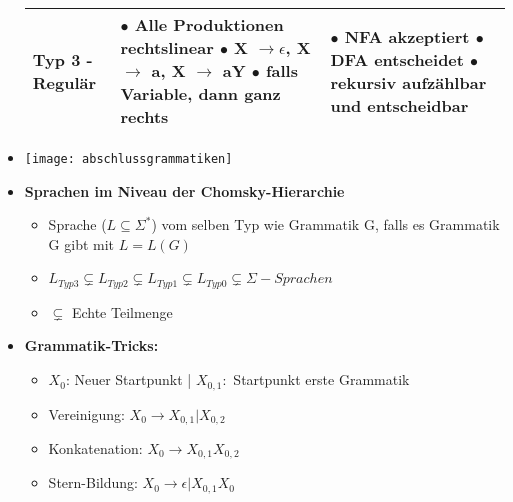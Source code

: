 \begin{itemize}
\begin{longtable}[h]{|p{4cm} | p{6cm} | p{7cm}|}
Typ 3 - Regulär &  \makecell[l]{$\bullet$ Alle Produktionen rechtslinear \\
$\bullet$ X $\rightarrow \epsilon$, X $\rightarrow$ a, X $\rightarrow$ aY \\
$\bullet$ falls Variable, dann ganz rechts} &
\makecell[l]{$\bullet$ NFA akzeptiert \\ $\bullet$ DFA entscheidet \\$\bullet$ rekursiv aufzählbar und entscheidbar} \\ \hline

\end{longtable}

\item[]
	\begin{center}
	\texttt{[image: abschlussgrammatiken]}
	\end{center}
	
\item \textbf{Sprachen im Niveau der Chomsky-Hierarchie}
	\begin{itemize}
	
	\item Sprache ($L \subseteq \Sigma^*$)	vom selben Typ wie Grammatik G, falls es Grammatik G gibt mit $L = L(G)$
	\item $L_{Typ3} \subsetneq L_{Typ2} \subsetneq L_{Typ1} \subsetneq L_{Typ0} \subsetneq \Sigma-Sprachen$
	\item $\subsetneq$ Echte Teilmenge
	
	\end{itemize}
	
\item \textbf{Grammatik-Tricks:}
	\begin{itemize}
	\item $X_0$: Neuer Startpunkt | $X_{0,1}:$ Startpunkt erste Grammatik
	\item Vereinigung: $X_0 \rightarrow X_{0,1} | X_{0,2}$
	\item Konkatenation: $X_0 \rightarrow X_{0,1} X_{0,2}$
	\item Stern-Bildung: $X_0 \rightarrow \epsilon|X_{0,1}X_0$ 
	\end{itemize}
	
\pagebreak	
	

\end{itemize}
